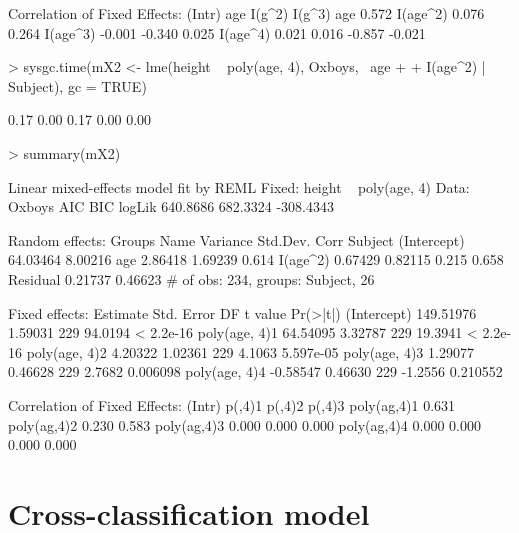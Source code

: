 \documentclass[12pt]{article}
\begin{document}
\begin{Schunk}
\begin{Soutput}
Correlation of Fixed Effects:
         (Intr) age    I(g^2) I(g^3)
age       0.572                     
I(age^2)  0.076  0.264              
I(age^3) -0.001 -0.340  0.025       
I(age^4)  0.021  0.016 -0.857 -0.021
\end{Soutput}
\begin{Sinput}
> sysgc.time(mX2 <- lme(height ~ poly(age, 4), Oxboys, ~age + 
+     I(age^2) | Subject), gc = TRUE)
\end{Sinput}
\begin{Soutput}
[1] 0.17 0.00 0.17 0.00 0.00
\end{Soutput}
\begin{Sinput}
> summary(mX2)
\end{Sinput}
\begin{Soutput}
Linear mixed-effects model fit by REML
Fixed: height ~ poly(age, 4) 
 Data: Oxboys 
      AIC      BIC    logLik
 640.8686 682.3324 -308.4343

Random effects:
 Groups   Name        Variance Std.Dev. Corr        
 Subject  (Intercept) 64.03464 8.00216              
          age          2.86418 1.69239  0.614       
          I(age^2)     0.67429 0.82115  0.215 0.658 
 Residual              0.21737 0.46623              
# of obs: 234, groups: Subject, 26

Fixed effects:
               Estimate Std. Error  DF t value  Pr(>|t|)
(Intercept)   149.51976    1.59031 229 94.0194 < 2.2e-16
poly(age, 4)1  64.54095    3.32787 229 19.3941 < 2.2e-16
poly(age, 4)2   4.20322    1.02361 229  4.1063 5.597e-05
poly(age, 4)3   1.29077    0.46628 229  2.7682  0.006098
poly(age, 4)4  -0.58547    0.46630 229 -1.2556  0.210552

Correlation of Fixed Effects:
            (Intr) p(,4)1 p(,4)2 p(,4)3
poly(ag,4)1 0.631                      
poly(ag,4)2 0.230  0.583               
poly(ag,4)3 0.000  0.000  0.000        
poly(ag,4)4 0.000  0.000  0.000  0.000 
\end{Soutput}
\end{Schunk}

\section{Cross-classification model}
\label{sec:CrossClassified}
\end{document}
